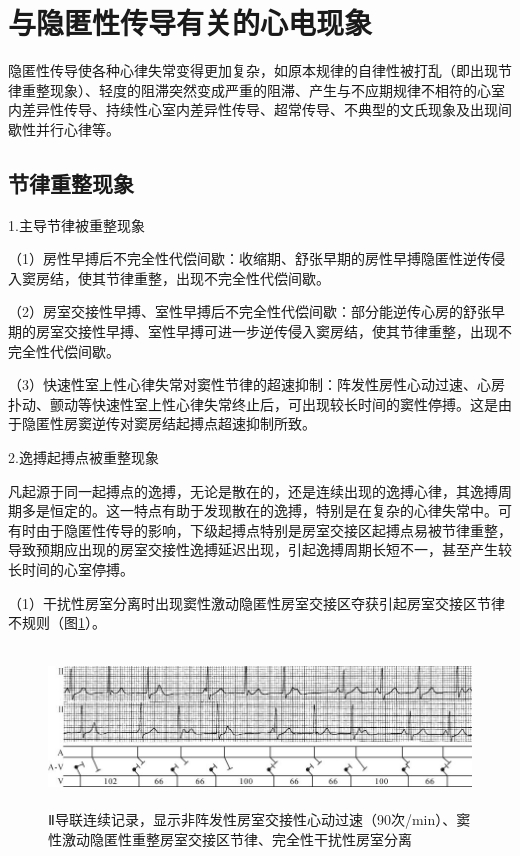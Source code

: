 \protect\hypertarget{text00042.htmlux5cux23subid453}{}{}

\section{与隐匿性传导有关的心电现象}

隐匿性传导使各种心律失常变得更加复杂，如原本规律的自律性被打乱（即出现节律重整现象）、轻度的阻滞突然变成严重的阻滞、产生与不应期规律不相符的心室内差异性传导、持续性心室内差异性传导、超常传导、不典型的文氏现象及出现间歇性并行心律等。

\protect\hypertarget{text00042.htmlux5cux23subid454}{}{}

\subsection{节律重整现象}

1.主导节律被重整现象

（1）房性早搏后不完全性代偿间歇：收缩期、舒张早期的房性早搏隐匿性逆传侵入窦房结，使其节律重整，出现不完全性代偿间歇。

（2）房室交接性早搏、室性早搏后不完全性代偿间歇：部分能逆传心房的舒张早期的房室交接性早搏、室性早搏可进一步逆传侵入窦房结，使其节律重整，出现不完全性代偿间歇。

（3）快速性室上性心律失常对窦性节律的超速抑制：阵发性房性心动过速、心房扑动、颤动等快速性室上性心律失常终止后，可出现较长时间的窦性停搏。这是由于隐匿性房窦逆传对窦房结起搏点超速抑制所致。

2.逸搏起搏点被重整现象

凡起源于同一起搏点的逸搏，无论是散在的，还是连续出现的逸搏心律，其逸搏周期多是恒定的。这一特点有助于发现散在的逸搏，特别是在复杂的心律失常中。可有时由于隐匿性传导的影响，下级起搏点特别是房室交接区起搏点易被节律重整，导致预期应出现的房室交接性逸搏延迟出现，引起逸搏周期长短不一，甚至产生较长时间的心室停搏。

（1）干扰性房室分离时出现窦性激动隐匿性房室交接区夺获引起房室交接区节律不规则（图\ref{fig35-1}）。

\begin{figure}[!htbp]
 \centering
 \includegraphics[width=5.80208in,height=1.65625in]{./images/Image00554.jpg}
 \captionsetup{justification=centering}
 \caption{Ⅱ导联连续记录，显示非阵发性房室交接性心动过速（90次/min）、窦性激动隐匿性重整房室交接区节律、完全性干扰性房室分离}
 \label{fig35-1}
  \end{figure} 

